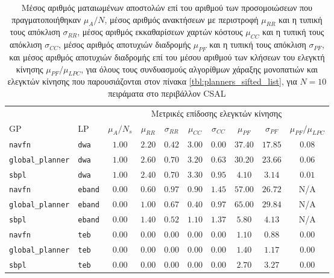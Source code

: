 \begin{table}[h]
\renewcommand{\arraystretch}{1.3}
\begin{tabular}{llcccccccc}
& & \multicolumn{8}{c}{Μετρικές επίδοσης ελεγκτών κίνησης} \\
\cline{3-10}
  GP & LP & $\mu_{A} / N_s$ & $\mu_{RR}$ & $\sigma_{RR}$ & $\mu_{CC}$ & $\sigma_{CC}$ & $\mu_{PF}$ & $\sigma_{PF}$ & $\mu_{PF} / \mu_{LPC}$ \\ \toprule
  \texttt{navfn} & \texttt{dwa} & $1.00$ & $2.20$ & $0.42$ & $3.00$ & $0.00$ & $37.40$ & $17.85$ & $0.08$ \\
  \texttt{global\_planner} & \texttt{dwa} & $1.00$ & $2.60$ & $0.70$ & $3.20$ & $0.63$ & $30.20$ & $23.66$ & $0.06$ \\
  \texttt{sbpl} & \texttt{dwa} & $1.00$ & $2.40$ & $0.70$ & $3.30$ & $0.95$ & $4.10$ & $3.14$ & $0.01$ \\
  \texttt{navfn} & \texttt{eband} & $0.00$ & $0.60$ & $0.97$ & $0.90$ & $1.45$ & $57.00$ & $26.72$ & N/A \\
  \texttt{global\_planner} & \texttt{eband} & $0.00$ & $1.00$ & $0.67$ & $0.40$ & $0.97$ & $65.00$ & $29.84$ & N/A \\
  \texttt{sbpl} & \texttt{eband} & $0.00$ & $1.40$ & $0.52$ & $1.10$ & $1.37$ & $5.80$ & $4.13$ & N/A \\
  \texttt{navfn} & \texttt{teb} & $0.00$ & $0.00$ & $0.00$ & $0.00$ & $0.00$ & $1.10$ & $0.88$ & $0.00$ \\
  \texttt{global\_planner} & \texttt{teb} & $0.00$ & $0.00$ & $0.00$ & $0.00$ & $0.00$ & $1.40$ & $1.17$ & $0.00$ \\
  \texttt{sbpl} & \texttt{teb} & $0.00$ & $0.00$ & $0.00$ & $0.00$ & $0.00$ & $2.70$ & $3.27$ & $0.00$ \\ \bottomrule
\end{tabular}
\caption{\small Μέσος αριθμός ματαιωμένων αποστολών επί του αριθμού των
      προσομοιώσεων που πραγματοποιήθηκαν $\mu_A / N$, μέσος αριθμός ανακτήσεων
      με περιστροφή $\mu_{RR}$ και η τυπική τους απόκλιση $\sigma_{RR}$, μέσος
      αριθμός εκκαθαρίσεων χαρτών κόστους $\mu_{CC}$ και η τυπική τους απόκλιση
      $\sigma_{CC}$, μέσος αριθμός αποτυχιών διαδρομής $\mu_{PF}$ και η τυπική
      τους απόκλιση $\sigma_{PF}$, και μέσος αριθμός αποτυχιών διαδρομής επί
      του μέσου αριθμού των κλήσεων του ελεγκτή κίνησης $\mu_{PF} / \mu_{LPC}$,
      για όλους τους συνδυασμούς αλγορίθμων χάραξης μονοπατιών και ελεγκτών
      κίνησης που παρουσιάζονται στον πίνακα \ref{tbl:planners_sifted_list},
      για $N=10$ πειράματα στο περιβάλλον CSAL}
\label{tbl:info_failures_csal}
\end{table}



